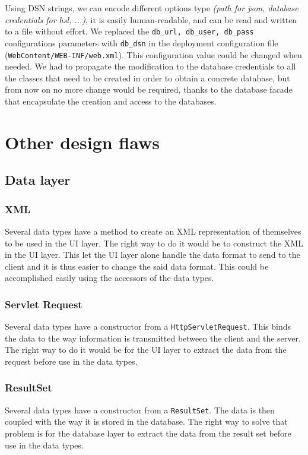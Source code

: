 Using DSN strings, we can encode different options type \textit{(path for json, database credentials for hsl, ...)}, it is easily human-readable, and can be read and written to a file without effort. We replaced the \texttt{db\_url, db\_user, db\_pass} configurations parameters with \texttt{db\_dsn} in the deployment configuration file (\texttt{WebContent/WEB-INF/web.xml}). This configuration value could be changed when needed. We had to propagate the modification to the database credentials to all the classes that need to be created in order to obtain a concrete database, but from now on no more change would be required, thanks to the database facade that encapsulate the creation and access to the databases.


\section{Other design flaws}

\subsection{Data layer}

\subsubsection{XML}
Several data types have a method to create an XML representation of themselves to be used in the UI layer. The right way to do it would be to construct the XML in the UI layer. This let the UI layer alone handle the data format to send to the client and it is thus easier to change the said data format. This could be accomplished easily using the accessors of the data types.

\subsubsection{Servlet Request}
Several data types have a constructor from a \texttt{HttpServletRequest}. This binds the data to the way information is transmitted between the client and the server. The right way to do it would be for the UI layer to extract the data from the request before use in the data types.

\subsubsection{ResultSet}
Several data types have a constructor from a \texttt{ResultSet}. The data is then coupled with the way it is stored in the database. The right way to solve that problem is for the database layer to extract the data from the result set before use in the data types.

